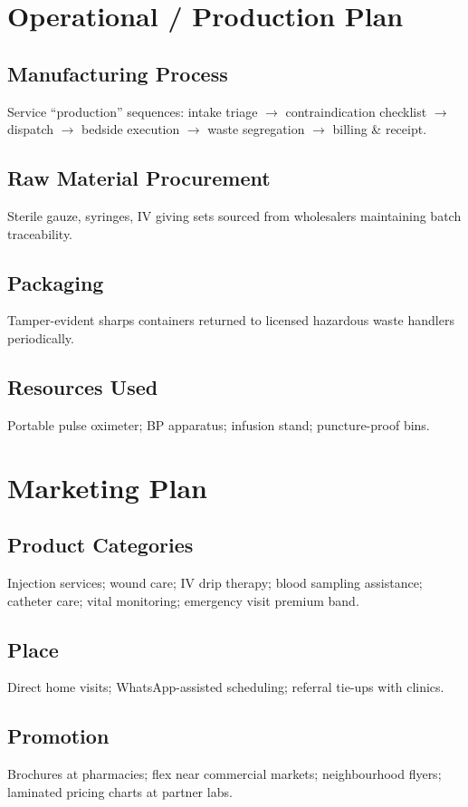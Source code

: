 \documentclass[12pt,a4paper]{report}
\begin{document}
\chapter{Operational / Production Plan}

\section{Manufacturing Process}
Service ``production'' sequences: intake triage $\rightarrow$ contraindication checklist $\rightarrow$ dispatch $\rightarrow$ bedside execution $\rightarrow$ waste segregation $\rightarrow$ billing \& receipt.

\section{Raw Material Procurement}
Sterile gauze, syringes, IV giving sets sourced from wholesalers maintaining batch traceability.

\section{Packaging}
Tamper-evident sharps containers returned to licensed hazardous waste handlers periodically.

\section{Resources Used}
Portable pulse oximeter; BP apparatus; infusion stand; puncture-proof bins.

\chapter{Marketing Plan}

\section{Product Categories}
Injection services; wound care; IV drip therapy; blood sampling assistance; catheter care; vital monitoring; emergency visit premium band.

\section{Place}
Direct home visits; WhatsApp-assisted scheduling; referral tie-ups with clinics.

\section{Promotion}
Brochures at pharmacies; flex near commercial markets; neighbourhood flyers; laminated pricing charts at partner labs.
\end{document}
